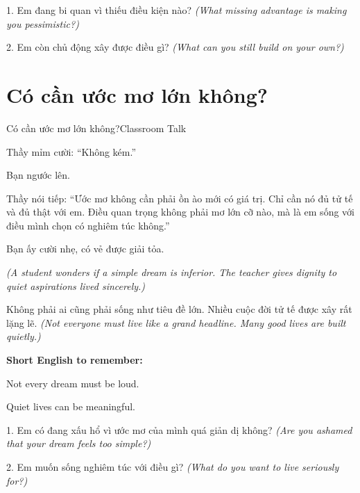\begin{tuhocnhanh}
1. Em đang bi quan vì thiếu điều kiện nào? \textit{(What missing advantage is making you pessimistic?)}

2. Em còn chủ động xây được điều gì? \textit{(What can you still build on your own?)}
\end{tuhocnhanh}
\ngancach

\section{Có cần ước mơ lớn không?}
\begin{truyen}{Có cần ước mơ lớn không?}{Classroom Talk}

Thầy mỉm cười: ``Không kém.''

Bạn ngước lên.

Thầy nói tiếp: ``Ước mơ không cần phải ồn ào mới có giá trị. Chỉ cần nó đủ tử tế và đủ thật với em. Điều quan trọng không phải mơ lớn cỡ nào, mà là em sống với điều mình chọn có nghiêm túc không.''

Bạn ấy cười nhẹ, có vẻ được giải tỏa.

\textit{(A student wonders if a simple dream is inferior. The teacher gives dignity to quiet aspirations lived sincerely.)}
\end{truyen}

\begin{baihoc}
Không phải ai cũng phải sống như tiêu đề lớn. Nhiều cuộc đời tử tế được xây rất lặng lẽ.
\textit{(Not everyone must live like a grand headline. Many good lives are built quietly.)}
\end{baihoc}

\begin{ghinhoanh}
\textbf{Short English to remember:}

Not every dream must be loud.

Quiet lives can be meaningful.
\end{ghinhoanh}

\begin{tuhocnhanh}
1. Em có đang xấu hổ vì ước mơ của mình quá giản dị không? \textit{(Are you ashamed that your dream feels too simple?)}

2. Em muốn sống nghiêm túc với điều gì? \textit{(What do you want to live seriously for?)}
\end{tuhocnhanh}
\ngancach

